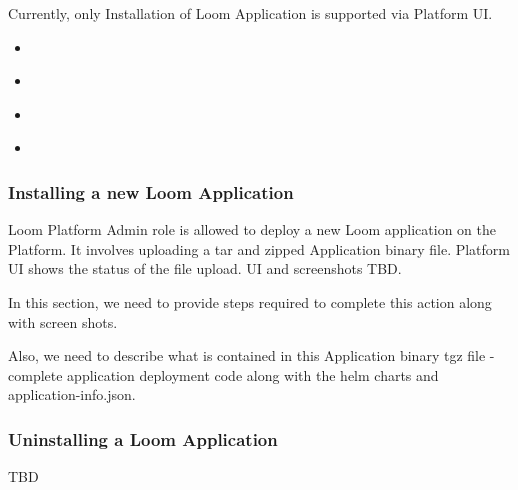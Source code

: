 \documentclass[letterpaper,10pt,english]{sphinxmanual}
\begin{document}
Currently, only Installation of Loom Application is supported via Platform UI.
\label{\detokenize{loom_getting_started_guide:content-loom-ui-appmgr}}
\begin{sphinxShadowBox}
\begin{itemize}
\item {} 
\label{\detokenize{loom_getting_started_guide:id108}}{\hyperref[\detokenize{loom_getting_started_guide:installing-a-new-loom-application}]{}}

\item {} 
\label{\detokenize{loom_getting_started_guide:id109}}{\hyperref[\detokenize{loom_getting_started_guide:uninstalling-a-loom-application}]{}}

\item {} 
\label{\detokenize{loom_getting_started_guide:id110}}{\hyperref[\detokenize{loom_getting_started_guide:upgrading-loom-application}]{}}

\item {} 
\label{\detokenize{loom_getting_started_guide:id111}}{\hyperref[\detokenize{loom_getting_started_guide:rolling-back-loom-application-upgrade}]{}}

\end{itemize}
\end{sphinxShadowBox}


\subsubsection{Installing a new Loom Application}
\label{\detokenize{loom_getting_started_guide:installing-a-new-loom-application}}
Loom Platform Admin role is allowed to deploy a new Loom application on the Platform. It involves uploading a tar and zipped Application binary file.  Platform UI shows the status of the file upload.  UI and screenshots TBD.

In this section, we need to provide steps required to complete this action along with screen shots.

Also, we need to describe what is contained in this Application binary tgz file - complete application deployment code along with the helm charts and application-info.json.


\subsubsection{Uninstalling a Loom Application}
\label{\detokenize{loom_getting_started_guide:uninstalling-a-loom-application}}
TBD
\end{document}
